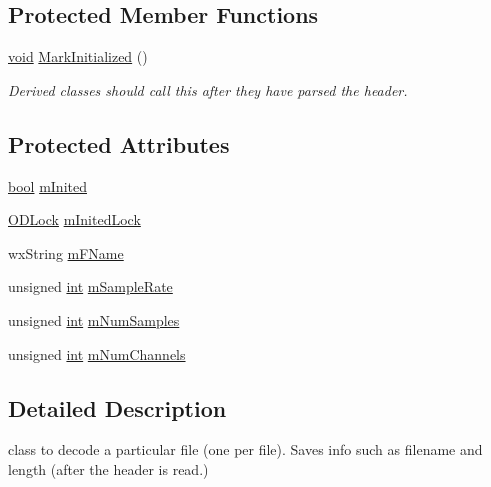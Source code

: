 \subsection*{Protected Member Functions}
\begin{DoxyCompactItemize}
\item 
\hyperlink{sound_8c_ae35f5844602719cf66324f4de2a658b3}{void} \hyperlink{class_o_d_file_decoder_aec8c8e8aad7a504278c9e28840c5a306}{Mark\+Initialized} ()
\begin{DoxyCompactList}\small\item\em Derived classes should call this after they have parsed the header. \end{DoxyCompactList}\end{DoxyCompactItemize}
\subsection*{Protected Attributes}
\begin{DoxyCompactItemize}
\item 
\hyperlink{mac_2config_2i386_2lib-src_2libsoxr_2soxr-config_8h_abb452686968e48b67397da5f97445f5b}{bool} \hyperlink{class_o_d_file_decoder_a5b1f8a79d3e820ae550fd56ae2492b0e}{m\+Inited}
\item 
\hyperlink{class_o_d_lock}{O\+D\+Lock} \hyperlink{class_o_d_file_decoder_a37da548db4b725cfa4d3d4edea169f5e}{m\+Inited\+Lock}
\item 
wx\+String \hyperlink{class_o_d_file_decoder_a05466f618761fa4bcdb7c3db42df9d9e}{m\+F\+Name}
\item 
unsigned \hyperlink{xmltok_8h_a5a0d4a5641ce434f1d23533f2b2e6653}{int} \hyperlink{class_o_d_file_decoder_a6360e9140219a755c2479ba56780489f}{m\+Sample\+Rate}
\item 
unsigned \hyperlink{xmltok_8h_a5a0d4a5641ce434f1d23533f2b2e6653}{int} \hyperlink{class_o_d_file_decoder_a4c0e2d145bf0eb1582bf27abc5dbae8f}{m\+Num\+Samples}
\item 
unsigned \hyperlink{xmltok_8h_a5a0d4a5641ce434f1d23533f2b2e6653}{int} \hyperlink{class_o_d_file_decoder_afb494af021ae7c734889addabba39420}{m\+Num\+Channels}
\end{DoxyCompactItemize}


\subsection{Detailed Description}
class to decode a particular file (one per file). Saves info such as filename and length (after the header is read.) 

